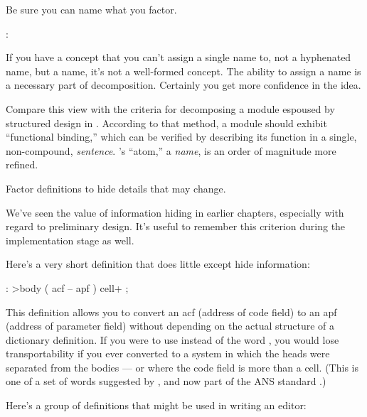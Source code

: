%
\begin{tip}
Be sure you can name what you factor.
\end{tip}

\medbreak
\begin{interview}
:
\begin{tfquot}
If you have a concept that you can't assign a single name to, not a
hyphenated name, but a name, it's not a well-formed concept. The
ability to assign a name is a necessary part of decomposition.
Certainly you get more confidence in the idea.
\end{tfquot}
\end{interview}
%
Compare this view with the criteria for decomposing a module espoused
by structured design in . According to that method, a module
should exhibit ``functional binding,'' which can be verified by
describing its function in a single, non-compound, \emph{sentence}.
\Forth{}'s ``atom,'' a \emph{name}, is an order of magnitude more
refined.

\begin{tip}
Factor definitions to hide details that may change.
\end{tip}
%
We've seen the value of information hiding in earlier chapters,
especially with regard to preliminary design. It's useful to remember
this criterion during the implementation stage as well.

Here's a very short definition that does little except hide information:

\begin{Code}
: >body  ( acf -- apf )  cell+ ;
\end{Code}
This definition allows you to convert an acf (address of code field) to an apf
(address of parameter field) without depending on the actual structure of a
dictionary definition. If you were to use  instead of the word
, you would lose transportability if you ever converted to a
\Forth{} system in which the heads were separated from the bodies --- or where
the code field is more than a cell.  (This is one of a set of words suggested
by , and now part of the ANS \Forth{} standard
\cite{harris83}.)

Here's a group of definitions that might be used in writing an editor:

